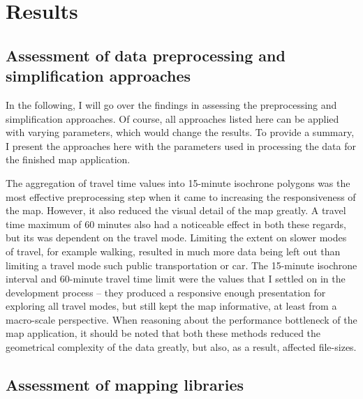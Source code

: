 \section{Results}

\subsection{Assessment of data preprocessing and simplification approaches}


In the following, I will go over the findings in assessing the preprocessing and simplification approaches.
Of course, all approaches listed here can be applied with varying parameters,
which would change the results.
To provide a summary,
I present the approaches here with the parameters used in processing the data for the finished map application.

The aggregation of travel time values into 15-minute isochrone polygons was the most 
effective preprocessing step when it came to increasing the responsiveness of the map.
However, it also reduced the visual detail of the map greatly.
A travel time maximum of 60 minutes also had a noticeable effect in both these regards,
but its was dependent on the travel mode.
Limiting the extent on slower modes of travel, for example walking,
resulted in much more data being left out than limiting a travel mode such public transportation or car.
The 15-minute isochrone interval and 60-minute travel time limit
were the values that I settled on in the development process --
they produced a responsive enough presentation for exploring all travel modes,
but still kept the map informative, at least from a macro-scale perspective.
When reasoning about the performance bottleneck of the map application,
it should be noted that both these methods reduced the geometrical complexity of the data greatly,
but also, as a result, affected file-sizes.







\subsection{Assessment of mapping libraries}

